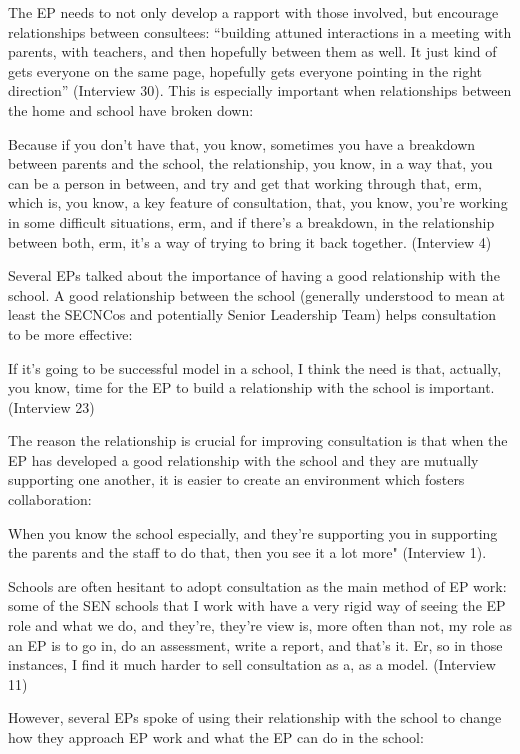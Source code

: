 \documentclass[
]{article}
\begin{document}
The EP needs to not only develop a rapport with those involved, but
encourage relationships between consultees: ``building attuned
interactions in a meeting with parents, with teachers, and then
hopefully between them as well. It just kind of gets everyone on the
same page, hopefully gets everyone pointing in the right direction''
(Interview 30). This is especially important when relationships between
the home and school have broken down:

Because if you don't have that, you know, sometimes you have a breakdown
between parents and the school, the relationship, you know, in a way
that, you can be a person in between, and try and get that working
through that, erm, which is, you know, a key feature of consultation,
that, you know, you're working in some difficult situations, erm, and if
there's a breakdown, in the relationship between both, erm, it's a way
of trying to bring it back together. (Interview 4)

Several EPs talked about the importance of having a good relationship
with the school. A good relationship between the school (generally
understood to mean at least the SECNCos and potentially Senior
Leadership Team) helps consultation to be more effective:

If it's going to be successful model in a school, I think the need is
that, actually, you know, time for the EP to build a relationship with
the school is important. (Interview 23)

The reason the relationship is crucial for improving consultation is
that when the EP has developed a good relationship with the school and
they are mutually supporting one another, it is easier to create an
environment which fosters collaboration:

When you know the school especially, and they're supporting you in
supporting the parents and the staff to do that, then you see it a lot
more" (Interview 1).

Schools are often hesitant to adopt consultation as the main method of
EP work: some of the SEN schools that I work with have a very rigid way
of seeing the EP role and what we do, and they're, they're view is, more
often than not, my role as an EP is to go in, do an assessment, write a
report, and that's it. Er, so in those instances, I find it much harder
to sell consultation as a, as a model. (Interview 11)

However, several EPs spoke of using their relationship with the school
to change how they approach EP work and what the EP can do in the
school:
\end{document}
